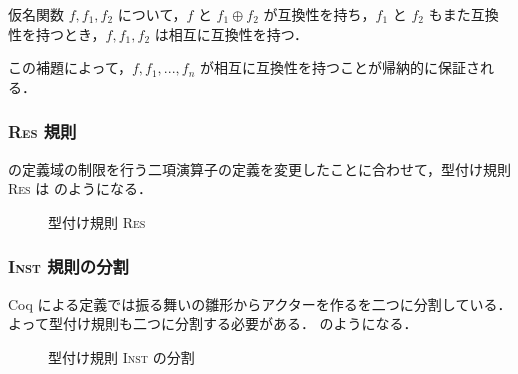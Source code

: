 \begin{lem}
  仮名関数 $f, f_1, f_2$ について，$f$ と $f_1 \oplus f_2$ が互換性を持ち，$f_1$ と $f_2$ もまた互換性を持つとき，$f, f_1, f_2$ は相互に互換性を持つ．
  \label{lem:compatible}
\end{lem}

この補題によって，$f, f_1, ... , f_n$ が相互に互換性を持つことが帰納的に保証される．%



\subsubsection{\textsc{Res} 規則}

\tmp の定義域の制限を行う二項演算子の定義を変更したことに合わせて，型付け規則 \textsc{Res} は  のようになる．

\begin{figure*}[t]
  \caption{型付け規則 \textsc{Res}}
  \label{api:res_rule}
\end{figure*}

\subsubsection{\textsc{Inst} 規則の分割}

Coq による定義では振る舞いの雛形からアクターを作る\conf を二つに分割している．よって型付け規則も二つに分割する必要がある． のようになる．

\begin{figure*}[t]
  \vspace{14pt}
  \caption{型付け規則 \textsc{Inst} の分割}
  \label{api:inst_rule}
\end{figure*}


